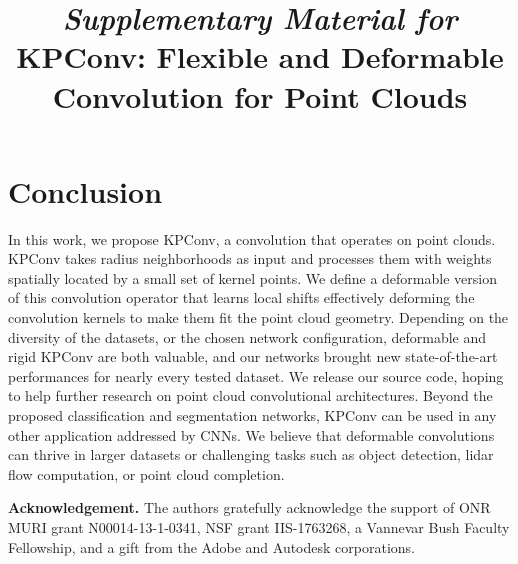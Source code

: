 \documentclass[10pt,twocolumn,letterpaper]{article}
\begin{document}
\section{Conclusion}

In this work, we propose KPConv, a convolution that operates on point clouds. KPConv takes radius neighborhoods as input and processes them with weights spatially located by a small set of kernel points. We define a deformable version of this convolution operator that learns local shifts effectively deforming the convolution kernels to make them fit the point cloud geometry. Depending on the diversity of the datasets, or the chosen network configuration, deformable and rigid KPConv are both valuable, and our networks brought new state-of-the-art performances for nearly every tested dataset. We release our source code, hoping to help further research on point cloud convolutional architectures. Beyond the proposed classification and segmentation networks, KPConv can be used in any other application addressed by CNNs. We believe that deformable convolutions can thrive in larger datasets or challenging tasks such as object detection, lidar flow computation, or point cloud completion.

\noindent
\textbf{Acknowledgement.} The authors gratefully acknowledge
the support of ONR MURI grant N00014-13-1-0341, NSF grant IIS-1763268, a Vannevar Bush Faculty Fellowship, and a gift from the Adobe and Autodesk corporations.

\clearpage

{\small


}





\clearpage






\pretitle{\vspace{10ex}}
\posttitle{\vspace{10ex}}
\title{\textit{Supplementary Material for} \\ KPConv: Flexible and Deformable Convolution for Point Clouds}
\preauthor{}
\postauthor{}
\author{}

\maketitle


\renewcommand{\thesection}{\Alph{section}}
\setcounter{section}{0}
\end{document}
